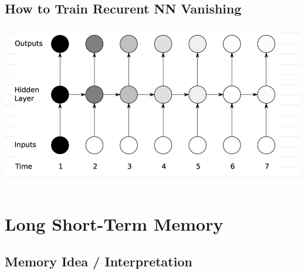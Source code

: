 \documentclass{beamer}
\begin{document}
	\subsection*{How to Train Recurent NN Vanishing}
	\begin{frame}
		
		\begin{center}
			\includegraphics[scale=0.3]{img/van1}
		\end{center}					
	\end{frame}
		

	\section*{Long Short-Term Memory}
	\subsection*{Memory Idea / Interpretation}
\end{document}
